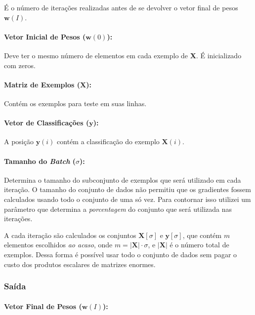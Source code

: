 \documentclass[a4paper, 12pt]{article}
\begin{document}
É o número de iterações realizadas antes de se devolver o vetor final de pesos
$\textbf{w}(I)$.

\paragraph{Vetor Inicial de Pesos ($\textbf{w}(0)$):}

Deve ter o mesmo número de elementos em cada exemplo de \textbf{X}.
É inicializado com zeros.

\paragraph{Matriz de Exemplos ($\textbf{X}$):}

Contém os exemplos para teste em suas linhas.

\paragraph{Vetor de Classificações ($\textbf{y}$):}

A posição $\textbf{y}(i)$ contém a classificação
do exemplo $\textbf{X}(i)$.

\paragraph{Tamanho do \textit{Batch} ($\sigma$):}

Determina o tamanho do subconjunto de exemplos que será utilizado em cada
iteração. O tamanho do conjunto de dados não permitiu que os gradientes
fossem calculados usando todo o conjunto de uma só vez. Para contornar
isso utilizei um parâmetro que determina a \textit{porcentagem} do
conjunto que será utilizada nas iterações.

A cada iteração são calculados os conjuntos $\textbf{X}[\sigma]$ e
$\textbf{y}[\sigma]$, que contém $m$  elementos escolhidos \textit{ao acaso},
onde $m = |\textbf{X}| \cdot \sigma$, e $|\textbf{X}|$ é o número total de
exemplos.  Dessa forma é possível usar todo o conjunto de dados sem pagar o
custo dos produtos escalares de matrizes enormes.

\subsubsection{Saída}

\paragraph{Vetor Final de Pesos ($\textbf{w}(I)$):}
\end{document}

